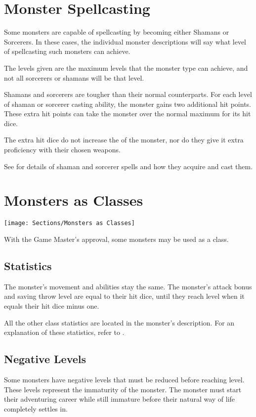\begin{multicols*}{2}
\section{Monster Spellcasting}
Some monsters are capable of spellcasting by becoming either Shamans or Sorcerers. In these cases, the individual monster descriptions will say what level of spellcasting such monsters can achieve.

The levels given are the maximum levels that the monster type can achieve, and not all sorcerers or shamans will be that level.

Shamans and sorcerers are tougher than their normal counterparts. For each level of shaman or sorcerer casting ability, the monster gains two additional hit points. These extra hit points can take the monster over the normal maximum for its hit dice.

The extra hit dice do not increase the  of the monster, nor do they give it extra proficiency with their chosen weapons.

See  for details of shaman and sorcerer spells and how they acquire and cast them.

\section{Monsters as Classes}

\texttt{[image: Sections/Monsters as Classes]}

With the Game Master’s approval, some monsters may be used as a class.

\subsection{Statistics}
The monster’s movement and abilities stay the same. The monster’s attack bonus and saving throw level are equal to their hit dice, until they reach  level when it equals their hit dice minus one.

All the other class statistics are located in the monster’s description. For an explanation of these statistics, refer to .

\subsection{Negative Levels}
Some monsters have negative levels that must be reduced before reaching  level. These levels represent the immaturity of the monster. The monster must start their adventuring career while still immature before their natural way of life completely settles in.


\end{multicols*}
